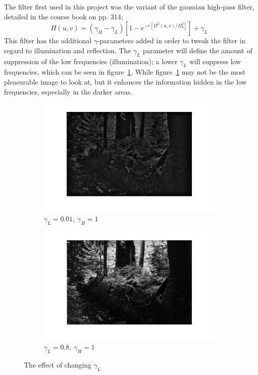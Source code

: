 		The filter first used in this project was
		the variant of the gaussian high-pass filter, detailed in the course book on pp. 314; 
		\begin{equation}
		\label{eqn:gaussian_filter}
			H(u,v) = \left( \gamma_H - \gamma_L \right) \left[ 1 - e^{-c \left[D^2(u,v)/D_0^2\right]}\right] + \gamma_L 
		\end{equation}
		This filter has the additional $\gamma$-parameters added in order to tweak
		the filter in regard to illumination and reflection. The $\gamma_L$ parameter
		will define the amount of suppression of the low frequencies (illumination); a lower $\gamma_L$
		will suppress low frequencies, which can be seen in figure~\ref{fig:low_freq_supp}. While
		figure~\ref{fig:low_freq_supp} may not be the most pleasurable image to look at, but it 
		enhances the information hidden in the low frequencies, especially in the darker areas.
		\begin{figure}[h!]
		\centering
		\begin{subfigure}[b]{0.6\textwidth}
			\includegraphics[width=\textwidth]{pics/suppressed_low_frequences.png}
			\caption{$\gamma_L = 0.01,~\gamma_H = 1$}
			\label{fig:low_freq_supp}
			\end{subfigure}%
			\begin{subfigure}[b]{0.6\textwidth}
			\includegraphics[width=\textwidth]{pics/non_suppressed_low_frequences.png}
			\caption{$\gamma_L = 0.8,~\gamma_H = 1$}
			\label{fig:low_freq_non_supp}
			\end{subfigure}
			\label{fig:various_low_gamma}
			\caption{The effect of changing $\gamma_L$}				
		\end{figure}		
